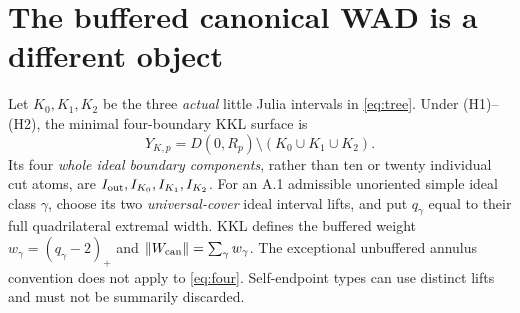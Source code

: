 \section{The buffered canonical WAD is a different object}
\label{sec:buffer}
Let $K_0,K_1,K_2$ be the three
\emph{actual} little Julia intervals in
\eqref{eq:tree}.  Under (H1)--(H2), the minimal
four-boundary KKL surface is
\begin{equation}\label{eq:four}
 Y_{K,p}=D(0,R_p)\setminus(K_0\cup K_1\cup K_2).
\end{equation}
Its four \emph{whole ideal boundary
components}, rather than ten or
twenty individual cut atoms, are
$I_{\rm out},I_{K_0},I_{K_1},I_{K_2}$.
For an A.1 admissible unoriented
simple ideal class $\gamma$,
choose its two \emph{universal-cover}
ideal interval lifts, and put
$q_\gamma$ equal to their full
quadrilateral extremal width.
KKL \cite[Appendix A.2.3--A.2.5]{KKL2026}
defines the buffered weight
$w_\gamma=(q_\gamma-2)_+$ and
$\lVert W_{\rm can}\rVert=\sum_\gamma
w_\gamma$.  The exceptional
unbuffered annulus convention
does not apply to \eqref{eq:four}.
Self-endpoint types can use
distinct lifts and must not be
summarily discarded.

